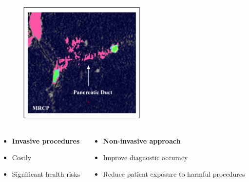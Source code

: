 \documentclass{beamer}
\begin{document}
\begin{frame}
\begin{columns}
\begin{column}{0.65\textwidth}
\begin{columns}
\begin{column}{0.5\textwidth}
                        \begin{figure}[H]
                            \centering
                            \includegraphics[width=0.6\textwidth]{figures/MRCP_0.jpg}
                        \end{figure}
                    \end{column}
                \end{columns}
                    
        
                \begin{columns}
        
                    \begin{column}{0.5\textwidth}
                    \begin{itemize}
                        \item \textbf{Invasive procedures}
                        \item Costly
                        \item Significant health risks 
                    \end{itemize}   
                    
                \end{column}

                \hspace{-0.15\textwidth}
                
        
                
                
                \begin{column}{0.5\textwidth}
        
                    \begin{itemize}
                        \item \textbf{Non-invasive approach}
                        \item Improve diagnostic accuracy 
                        \item Reduce patient exposure to harmful procedures
                    \end{itemize}   
                    

\end{column}
\end{columns}
\end{column}
\end{columns}
\end{frame}
\end{document}
